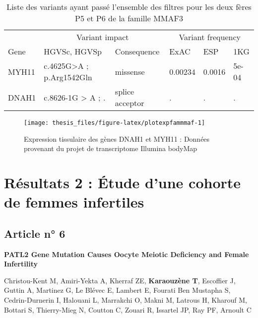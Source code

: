 \documentclass[12pt,twoside]{reedthesis}
\theoremstyle{definition}
\theoremstyle{definition}
\theoremstyle{remark}
\begin{document}
  \newpage
  
  \begin{longtable}[t]{llllll}
  \caption{\label{tab:tabrecapmmaf}Liste des variants ayant passé l'ensemble des filtres pour les deux fères P5 et P6 de la famille MMAF3}\\
  \toprule
  \multicolumn{1}{c}{ } & \multicolumn{2}{c}{Variant impact} & \multicolumn{3}{c}{Variant frequency} \\
  \cmidrule(l{2pt}r{2pt}){2-3} \cmidrule(l{2pt}r{2pt}){4-6}
  Gene & HGVSc, HGVSp & Consequence & ExAC & ESP & 1KG\\
  \midrule
  MYH11 & c.4625G>A ; p.Arg1542Gln & missense & 0.00234 & 0.0016 & 5e-04\\
  DNAH1 & c.8626-1G > A ; . & splice acceptor & . & . & .\\
  \bottomrule
  \end{longtable}
  
  \newpage
  
  \begin{figure}
  
  {\centering \texttt{[image: thesis\_files/figure-latex/plotexpfammmaf-1]} 
  
  }
  
  \caption[Expression tissulaire des gènes DNAH1 et MYH11]{Expression tissulaire des gènes DNAH1 et MYH11 : Données provenant du projet de transcriptome Illumina bodyMap}\label{fig:plotexpfammmaf}
  \end{figure}
  
  \newpage
  
  \section{Résultats 2 : Étude d'une cohorte de femmes
  infertiles}\label{resultats-2-etude-dune-cohorte-de-femmes-infertiles}
  
  \subsection{Article n° 6}\label{article-n-6}
  
  \textbf{PATL2 Gene Mutation Causes Oocyte Meiotic Deficiency and Female
  Infertility}
  
  Christou-Kent M, Amiri-Yekta A, Kherraf ZE, \textbf{Karaouzène T},
  Escoffier J, Guttin A, Martinez G, Le Blévec E, Lambert E, Fourati Ben
  Mustapha S, Cedrin-Durnerin I, Halouani L, Marrakchi O, Makni M, Latrous
  H, Kharouf M, Bottari S, Thierry-Mieg N, Coutton C, Zouari R, Issartel
  JP, Ray PF, Arnoult C
  
\end{document}
